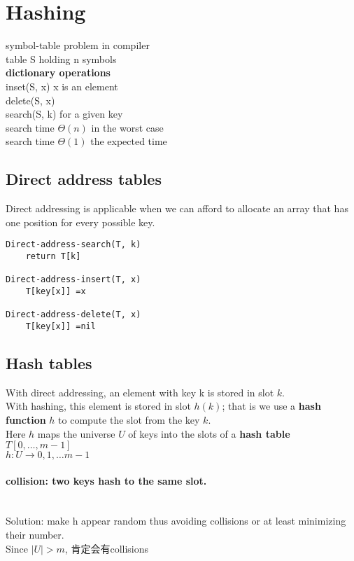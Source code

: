 \documentclass{article}
\begin{document}
\section{Hashing}
symbol-table problem in compiler\\
table S holding n symbols\\
\textbf{dictionary operations}\\
inset(S, x) x is an element\\
delete(S, x)\\
search(S, k) for a given key\\
search time $\Theta(n)$ in the worst case\\
search time $\Theta(1)$ the expected time\\

\subsection{Direct address tables}
Direct addressing is applicable when we can afford to allocate an array that has one position for every possible key.

\begin{verbatim}
Direct-address-search(T, k)
    return T[k]

Direct-address-insert(T, x)
    T[key[x]] =x

Direct-address-delete(T, x)
    T[key[x]] =nil
\end{verbatim}

\subsection{Hash tables}
With direct addressing, an element with key k is stored in slot $k$.\\
With hashing, this element is stored in slot $h(k)$; that is we use a \textbf{hash function} $h$ to compute the slot from the key $k$.\\
Here $h$ maps the universe $U$ of keys into the slots of a \textbf{hash table} $T[0,\ldots, m-1]$\\
$h: U \rightarrow {0,1, \ldots m-1}$

\paragraph{collision: two keys hash to the same slot.}~\\
Solution: make h appear random thus avoiding collisions or at least minimizing their number.\\
Since $|U|>m$, 肯定会有collisions
\end{document}
